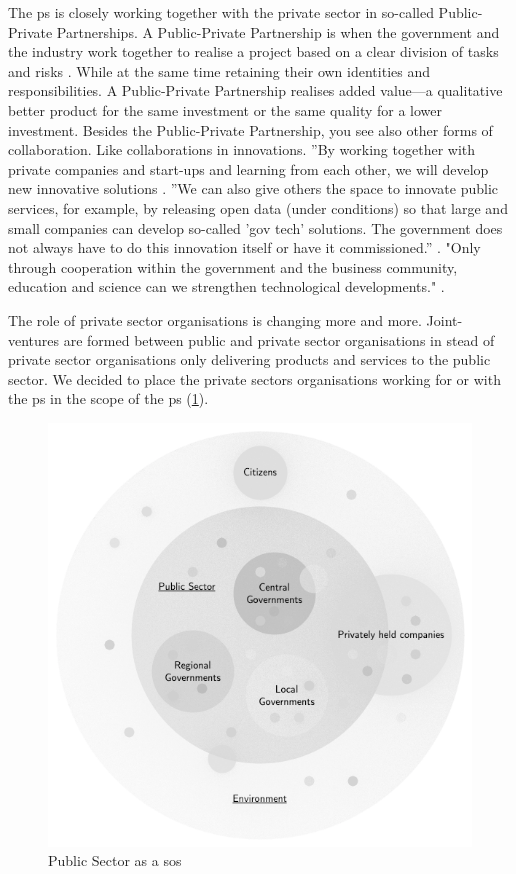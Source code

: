 The \gls{ps} is closely working together with the private sector in so-called Public-Private Partnerships. A Public-Private Partnership is when the government and the industry work together to realise a project based on a clear division of tasks and risks \parencite{PIANO}. While at the same time retaining their own identities and responsibilities. A Public-Private Partnership realises added value—a qualitative better product for the same investment or the same quality for a lower investment. Besides the Public-Private Partnership, you see also other forms of collaboration. Like collaborations in innovations. ''By working together with private companies and start-ups and learning from each other, we will develop new innovative solutions \parencite[p.~120]{Digitaleoverheid2021}. ''We can also give others the space to innovate public services, for example, by releasing open data (under conditions) so that large and small companies can develop so-called 'gov tech' solutions. The government does not always have to do this innovation itself or have it commissioned.'' \parencite[p.~120]{Digitaleoverheid2021}. "Only through cooperation within the government and the business community, education and science can we strengthen technological developments." \parencite[p.~68]{Digitaleoverheid2021}.

The role of private sector organisations is changing more and more. Joint-ventures are formed between public and private sector organisations in stead of private sector organisations only delivering products and services to the public sector. We decided to place the private sectors organisations working for or with the \gls{ps} in the scope of the \gls{ps} (\cref{fig:pssystemofsystems}).
\begin{figure}[H]
	\centering
	\includegraphics[width=0.5\linewidth]{images/pssystemofsystems}
	\caption[Public Sector as a \gls{sos}]{Public Sector as a \gls{sos}}
	\label{fig:pssystemofsystems}
\end{figure}

